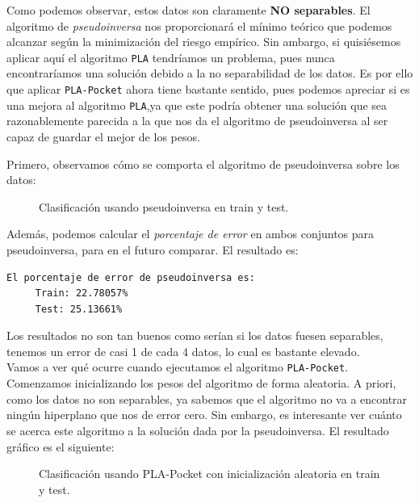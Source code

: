 \documentclass[12pt]{article}
\begin{document}
{Como podemos observar, estos datos son claramente \textbf{NO separables}. El algoritmo de \emph{pseudoinversa} nos proporcionará el mínimo teórico que podemos alcanzar según la minimización del riesgo empírico. Sin ambargo, si quisiésemos aplicar aquí el algoritmo \lstinline{PLA} tendríamos un problema, pues nunca encontraríamos una solución debido a la no separabilidad de los datos. Es por ello que aplicar \lstinline{PLA-Pocket} ahora tiene bastante sentido, pues podemos apreciar si es una mejora al algoritmo \lstinline{PLA},ya que este podría obtener una solución que sea razonablemente parecida a la que nos da el algoritmo de pseudoinversa al ser capaz de guardar el mejor de los pesos. 

Primero, observamos cómo se comporta el algoritmo de pseudoinversa sobre los datos:
\begin{figure}[H]
  \centering
  \qquad
  \caption{Clasificación usando pseudoinversa en train y test.}
\label{fig:myfig:4}
\end{figure}
Además, podemos calcular el \emph{porcentaje de error} en ambos conjuntos para pseudoinversa, para en el futuro comparar. El resultado es:
\begin{lstlisting}[language=bash]
  El porcentaje de error de pseudoinversa es:
	 Train: 22.78057%
	 Test: 25.13661%
\end{lstlisting}
Los resultados no son tan buenos como serían si los datos fuesen separables, tenemos un error de casi 1 de cada 4 datos, lo cual es bastante elevado.\\

Vamos a ver qué ocurre cuando ejecutamos el algoritmo \lstinline{PLA-Pocket}.  Comenzamos inicializando los pesos del algoritmo de forma aleatoria. A priori, como los datos no son separables, ya sabemos que el algoritmo no va a encontrar ningún hiperplano que nos de error cero. Sin embargo, es interesante ver cuánto se acerca este algoritmo a la solución dada por la pseudoinversa. El resultado gráfico es el siguiente:
\begin{figure}[H]
  \centering
  \qquad
  \caption{Clasificación usando PLA-Pocket con inicialización aleatoria en train y test.}
\label{fig:myfig:4}
\end{figure}

}
\end{document}
